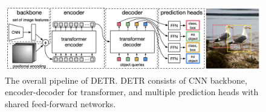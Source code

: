 \documentclass[10pt,twocolumn,letterpaper]{article}
\begin{document}
\begin{figure}[t]
    \includegraphics[width=\linewidth]{assets/detr.png}
    \caption{\label{fig:overview}The overall pipeline of DETR. DETR consists of CNN backbone, encoder-decoder for transformer, and multiple prediction heads with shared feed-forward networks.}
\end{figure}


{\small


}
\end{document}
